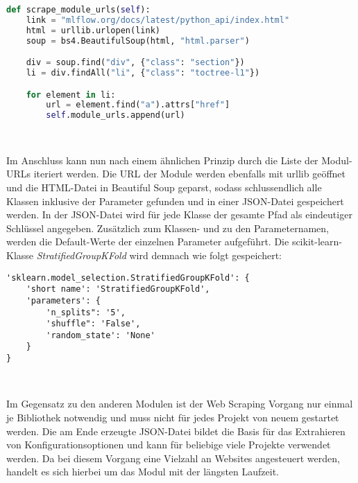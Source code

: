\documentclass[german,bachelor]{swsLeipzig}
\begin{document}
\noindent\begin{minipage}{\linewidth}
\begin{lstlisting}[language=Python, frame=single, label=scrape_moduls, basicstyle=\small, caption={Web Scraping der Modul-URLs},captionpos=b]
def scrape_module_urls(self):
    link = "mlflow.org/docs/latest/python_api/index.html"
    html = urllib.urlopen(link)
    soup = bs4.BeautifulSoup(html, "html.parser")

    div = soup.find("div", {"class": "section"})
    li = div.findAll("li", {"class": "toctree-l1"})

    for element in li:
        url = element.find("a").attrs["href"]
        self.module_urls.append(url)
\end{lstlisting}
\end{minipage}
\

Im Anschluss kann nun nach einem ähnlichen Prinzip durch die Liste der Modul-URLs iteriert werden.
Die URL der Module werden ebenfalls mit urllib geöffnet und die HTML-Datei in Beautiful Soup geparst, sodass
schlussendlich alle Klassen inklusive der Parameter gefunden und in einer JSON-Datei gespeichert werden.
In der JSON-Datei wird für jede Klasse der gesamte Pfad als eindeutiger Schlüssel angegeben.
Zusätzlich zum Klassen- und zu den Parameternamen, werden die Default-Werte der einzelnen Parameter aufgeführt.
Die scikit-learn-Klasse \textit{StratifiedGroupKFold} wird demnach wie folgt gespeichert:\\

\noindent\begin{minipage}{\linewidth}
\begin{lstlisting}[frame=single, label=json_scraping, basicstyle=\small, caption={Web Scraping Ergebnis der StratifiedGroupKFold-Klasse aus scikit-learn},captionpos=b]
'sklearn.model_selection.StratifiedGroupKFold': {
    'short name': 'StratifiedGroupKFold',
    'parameters': {
        'n_splits": '5',
        'shuffle": 'False',
        'random_state': 'None'
    }
}
\end{lstlisting}
\end{minipage}
\

Im Gegensatz zu den anderen Modulen ist der Web Scraping Vorgang nur einmal je Bibliothek notwendig und muss nicht für jedes Projekt
von neuem gestartet werden.
Die am Ende erzeugte JSON-Datei bildet die Basis für das Extrahieren von Konfigurationsoptionen und kann für beliebige viele
Projekte verwendet werden.
Da bei diesem Vorgang eine Vielzahl an Websites angesteuert werden, handelt es sich hierbei um das Modul mit der längsten Laufzeit.\\
\end{document}
